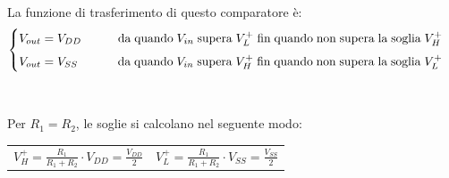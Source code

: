 \documentclass{report}
\begin{document}
La funzione di trasferimento di questo comparatore è:
\begin{equation}
	\begin{cases} %
		V_{out}= V_{DD}\indent\indent \mathrm{da\;quando\;} V_{in} \mathrm{\;supera\;} V_L^+ \mathrm{\;fin\;quando\;non\;supera\;la\;soglia\;} V_H^+\\[5pt]
		V_{out}= V_{SS}\;\indent\indent \mathrm{da\;quando\;} V_{in} \mathrm{\;supera\;} V_H^+ \mathrm{\;fin\;quando\;non\;supera\;la\;soglia\;} V_L^+\\
	\end{cases}
\end{equation}
\\\\Per $ R_1=R_2$, le soglie si calcolano nel seguente modo:
\begin{table}[h!]
	\begin{tabular}{cc}
		\;\;\;\;\;\;\;\;\;\;\;\;$\displaystyle{ V_H^+=\frac{R_1}{R_1+R_2}\cdot V_{DD}=\frac{V_{DD}}{2}}$\;\;\;\;\;\;\;\;\;\;\;\;\;\;\;\;\;\;\;\;\;\;\;\;\;\; & $\displaystyle{ V_L^+=\frac{R_1}{R_1+R_2}\cdot V_{SS}=\frac{V_{SS}}{2}}$\\ 
	\end{tabular}
\end{table}
\end{document}
